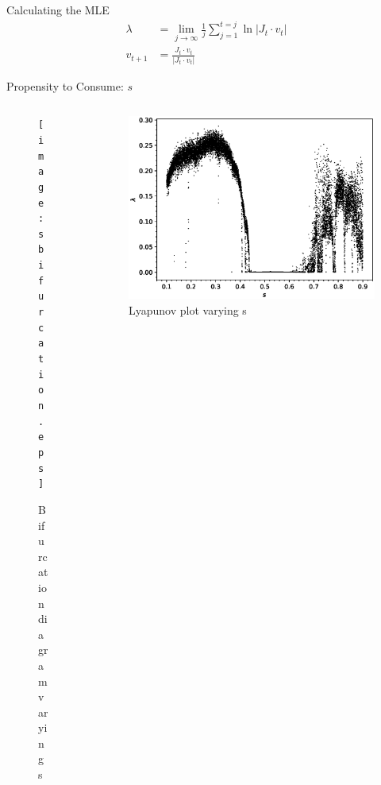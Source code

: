 \documentclass{beamer}
\begin{document}
\begin{frame}{Calculating the MLE}
	\begin{align*}
		\lambda &= \lim_{j\to\infty}\frac{1}{j}\sum^{t=j}_{j=1}\ln|J_t\cdot v_t|\\
		v_{t+1} &=\frac{J_t\cdot v_t}{|J_t\cdot v_t|}
	\end{align*}
\end{frame}
\begin{frame}{Propensity to Consume: $s$}
	\begin{columns}
	\begin{column}{0.5\textwidth}
		\begin{figure}
			\centering
			\texttt{[image: sbifurcation.eps]}
			\caption{Bifurcation diagram varying s}
		\end{figure}
	\end{column}
	\begin{column}{0.5\textwidth}
		\begin{figure}
			\centering
			\includegraphics[width=1.2\textwidth]{slyplot.eps}
			\caption{Lyapunov plot varying s}
		\end{figure}
	\end{column}
	\end{columns}
\end{frame}
\end{document}
